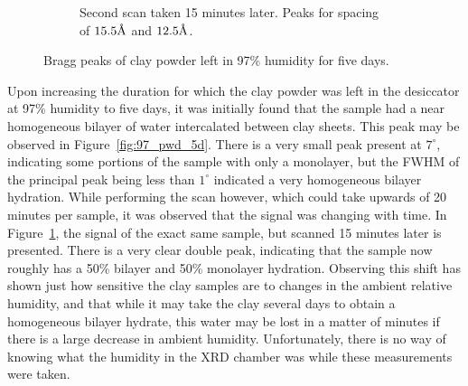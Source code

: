 \begin{figure}
\begin{subfigure}{.5\textwidth}
		\caption{Second scan taken 15 minutes later. Peaks for spacing of $15.5\text{\normalfont\AA}$ and $12.5\text{\normalfont\AA}$.}
		\label{fig:97_pwd_5d_2}
	\end{subfigure}
	\caption{Bragg peaks of clay powder left in 97\% humidity for five days.}
	\label{fig:97_pwd_double}
\end{figure}

Upon increasing the duration for which the clay powder was left in the desiccator at 97\% humidity to five days, it was initially found that the sample had a near homogeneous bilayer of water intercalated between clay sheets. This peak may be observed in Figure~\ref{fig:97_pwd_5d}. There is a very small peak present at $7^\circ$, indicating some portions of the sample with only a monolayer, but the FWHM of the principal peak being less than $1^\circ$ indicated a very homogeneous bilayer hydration. While performing the scan however, which could take upwards of 20 minutes per sample, it was observed that the signal was changing with time. In Figure~\ref{fig:97_pwd_5d_2}, the signal of the exact same sample, but scanned 15 minutes later is presented. There is a very clear double peak, indicating that the sample now roughly has a 50\% bilayer and 50\% monolayer hydration. Observing this shift has shown just how sensitive the clay samples are to changes in the ambient relative humidity, and that while it may take the clay several days to obtain a homogeneous bilayer hydrate, this water may be lost in a matter of minutes if there is a large decrease in ambient humidity. Unfortunately, there is no way of knowing what the humidity in the XRD chamber was while these measurements were taken.

